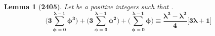 \documentclass[preview]{standalone}
\newtheorem*{lemma*}{Lemma}
\begin{document}
\begin{lemma*}[\textbf{2405}]
    Let \bm{$\iota$} be a positive integers such that
    \bm{$\big \lfloor \sqrt[3] \iota \big \rfloor = \lambda$}.
    \begin{equation*}
        \bm{
            \Bigg(
                3 \sum_{\phi=0}^{\lambda - 1} \phi ^3
            \Bigg)
                +
            \Bigg(
                3 \sum_{\phi=0}^{\lambda - 1} \phi ^2
            \Bigg)
                +
            \Bigg(
                \sum_{\phi=0}^{\lambda - 1} \phi
            \Bigg)
                \equiv
            \frac{
                \lambda ^3 - \lambda ^2
            }
            {4}
            \Bigg[ 3 \lambda + 1 \Bigg]
        }
    \end{equation*}
\end{lemma*}
\end{document}

